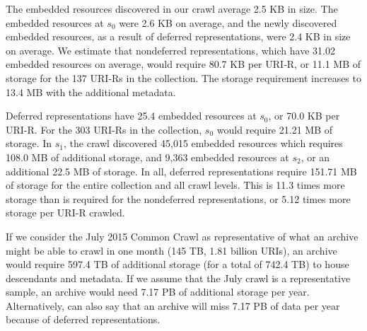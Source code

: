 \documentclass{sig-alternate}
\begin{document}
The embedded resources discovered in our crawl average 2.5 KB in size. The embedded resources at $s_0$ were 2.6 KB on average, and the newly discovered embedded resources, as a result of deferred representations, were 2.4 KB in size on average. We estimate that nondeferred representations, which have 31.02 embedded resources on average, would require 80.7 KB per URI-R, or 11.1 MB of storage for the 137 URI-Rs in the collection. The storage requirement increases to 13.4 MB with the additional metadata.

Deferred representations have 25.4 embedded resources at $s_0$, or 70.0 KB per URI-R. For the 303 URI-Rs in the collection, $s_0$ would require 21.21 MB of storage. In $s_1$, the crawl discovered 45,015 embedded resources which requires 108.0 MB of additional storage, and 9,363 embedded resources at $s_2$, or an additional 22.5 MB of storage. In all, deferred representations require 151.71 MB of storage for the entire collection and all crawl levels. This is 11.3 times more storage than is required for the nondeferred representations, or 5.12 times more storage per URI-R crawled. 

If we consider the July 2015 Common Crawl \cite{iaSize} as representative of what an archive might be able to crawl in one month (145 TB, 1.81 billion URIs), an archive would require 597.4 TB of additional storage (for a total of 742.4 TB) to house descendants and metadata. If we assume that the July crawl is a representative sample, an archive would need 7.17 PB of additional storage per year. Alternatively, can also say that an archive will miss 7.17 PB of data per year because of deferred representations.
\end{document}
